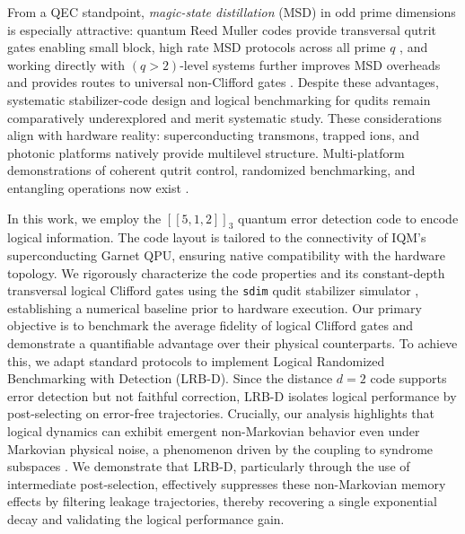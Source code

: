 From a QEC standpoint, \emph{magic-state distillation} (MSD) in odd prime dimensions is especially attractive: quantum Reed Muller codes provide transversal qutrit gates enabling small block, high rate MSD protocols across all prime \(q\) \cite{CampbellPRX2012}, and working directly with \((q>2)\)-level systems further improves MSD overheads and provides routes to universal non-Clifford gates \cite{CampbellPRL2014}. Despite these advantages, systematic stabilizer-code design and logical benchmarking for qudits remain comparatively underexplored and merit systematic study. These considerations align with hardware reality: superconducting transmons, trapped ions, and photonic platforms natively provide multilevel structure.  Multi-platform demonstrations of coherent qutrit control, randomized benchmarking, and entangling operations now exist \cite{Morvan2021,Ringbauer2022,Goss2024}.

In this work, we employ the $[[5,1,2]]_3$ quantum error detection code to encode logical information. The code layout is tailored to the connectivity of IQM’s superconducting Garnet QPU, ensuring native compatibility with the hardware topology. We rigorously characterize the code properties and its constant-depth transversal logical Clifford gates using the \texttt{sdim} qudit stabilizer simulator \cite{sdim}, establishing a numerical baseline prior to hardware execution. Our primary objective is to benchmark the average fidelity of logical Clifford gates and demonstrate a quantifiable advantage over their physical counterparts. To achieve this, we adapt standard protocols to implement Logical Randomized Benchmarking with Detection (LRB-D). Since the distance $d=2$ code supports error detection but not faithful correction, LRB-D isolates logical performance by post-selecting on error-free trajectories. Crucially, our analysis highlights that logical dynamics can exhibit emergent non-Markovian behavior even under Markovian physical noise, a phenomenon driven by the coupling to syndrome subspaces \cite{Ziyad2025}. We demonstrate that LRB-D, particularly through the use of intermediate post-selection, effectively suppresses these non-Markovian memory effects by filtering leakage trajectories, thereby recovering a single exponential decay and validating the logical performance gain.